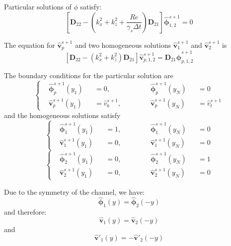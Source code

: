 \documentclass[titlepage,12pt,letter]{article}
\newcommand{\bracket}[1]{\left[ #1 \right]}
\newcommand{\re}{Re}
\numberwithin{equation}{section}
\begin{document}
Particular solutions of $\phi$ satisfy:
\begin{equation}
	\bracket{\bm{D}_{22}-\left(k_x^{2}+k_z^{2}+\frac{\re}{\gamma_{s} \Delta t}\right) \bm{D}_{21}} \hat{\bm{\phi}}_{1,2}^{s+1}=0 \label{eq:phi1}
\end{equation}


The equation for  $\hat{\bm{v}}_{p}^{s+1}$ and two homogeneous solutions $\hat{\bm{v}}_{1}^{s+1}$ and $\hat{\bm{v}}_{2}^{s+1}$ is
\begin{equation}
		\bracket{\bm{D}_{22}-\left(k_x^{2}+k_z^{2}\right) \bm{D}_{21}} \hat{\bm{v}}_{p,1,2}^{s+1}=\bm{D}_{21} \hat{\bm{\phi}}_{p,1,2}^{s+1} \label{eq:v}
\end{equation}

The boundary conditions for the particular solution are
\begin{equation}
	\left\{
\begin{aligned}
	&\hat{\bm{\phi}}_{p}^{s+1}\left(y_{1}\right)&&=0, &&\quad &&\hat{\bm{\phi}}_{p}^{s+1}\left(y_{N}\right)&&=0 \\
	&\hat{\bm{v}}_{p}^{s+1}\left(y_{1}\right)&&=\hat{{v}}_{b}^{s+1}, &&\quad &&\hat{\bm{v}}_{p}^{s+1}\left(y_{N}\right)&&=\hat{{v}}_{t}^{s+1}
\end{aligned}\right.\label{eq:phip_bc}
\end{equation}
and the homogeneous solutions satisfy
\begin{equation}
	\left\{\begin{aligned}
	&\hat{\bm{\phi}}_{1}^{s+1}\left(y_{1}\right)&&=1, &&\quad &&\hat{\bm{\phi}}_{1}^{s+1}\left(y_{N}\right)&&=0 \\
	&\hat{\bm{v}}_{1}^{s+1}\left(y_{1}\right)&&=0, &&\quad &&\hat{\bm{v}}_{1}^{s+1}\left(y_{N}\right)&&=0
\end{aligned}\right. \label{eq:phi1_bc}
\end{equation}
\begin{equation}
 \left\{	\begin{aligned}
	&\hat{\bm{\phi}}_{2}^{s+1}\left(y_{1}\right)&&=0, &&\quad &&\hat{\bm{\phi}}_{2}^{s+1}\left(y_{N}\right)&&=1 \\
	&\hat{\bm{v}}_{2}^{s+1}\left(y_{1}\right)&&=0, &&\quad &&\hat{\bm{v}}_{2}^{s+1}\left(y_{N}\right)&&=0
\end{aligned}\right. \label{eq:phi2_bc}
\end{equation}

Due to the symmetry of the channel, we have:
\begin{equation*}
	\hat{\bm{\phi}}_1(y) = \hat{\bm{\phi}}_2(-y)
\end{equation*}
and therefore:
\begin{equation*}
	\hat{\bm{v}}_1(y) = \hat{\bm{v}}_2(-y)
\end{equation*}
and
\begin{equation*}
	\hat{\bm{v}}'_1(y) = -\hat{\bm{v}}'_2(-y)
\end{equation*}
\end{document}

